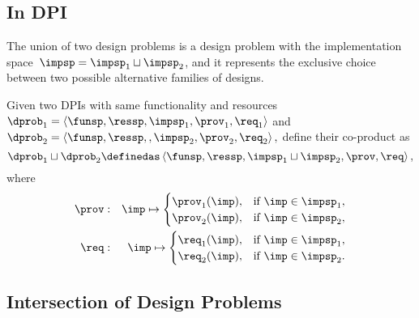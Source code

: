 \subsection{In DPI}\label{subsec:dpi-union}


The union of two design problems is a design problem with the implementation
space~$\impsp=\impsp_{1}\sqcup\impsp_{2}$, and it represents the
exclusive choice between two possible alternative families of designs.
\begin{definition}[Co-product]
  \label{def:parallel-1}Given two DPIs with same functionality and
  resources $\dprob_{1}=\left\langle \funsp,\ressp,\impsp_{1},\prov_{1},\req_{1}\right\rangle $
  and $\dprob_{2}=\left\langle \funsp,\ressp,,\impsp_{2},\prov_{2},\req_{2}\right\rangle ,$
  define their co-product as
  \[
    \dprob_{1}\sqcup\dprob_{2}\definedas\left\langle \funsp,\ressp,\impsp_{1}\sqcup\impsp_{2},\prov,\req\right\rangle ,
  \]
  where
  \begin{eqnarray}
    \prov & : & \imp\mapsto\begin{cases}
                             \prov_{1}(\imp), & \text{if }\imp\in\impsp_{1},\\
                             \prov_{2}(\imp), & \text{if }\imp\in\impsp_{2},
    \end{cases}\label{eq:dppar-exec-1}\\
    \req & : & \imp\mapsto\begin{cases}
                            \req_{1}(\imp), & \text{if }\imp\in\impsp_{1},\\
                            \req_{2}(\imp), & \text{if }\imp\in\impsp_{2}.
    \end{cases}\nonumber
  \end{eqnarray}
\end{definition}




\begin{figure}[h!]
  \centering
  \caption{\label{fig:dpcoproduct}}
\end{figure}

\subsection{Intersection of Design Problems}

